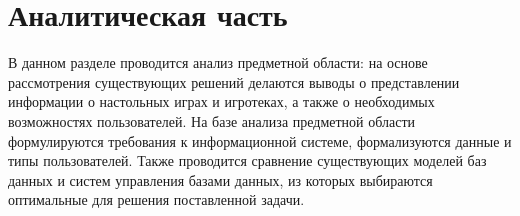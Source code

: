 \chapter{Аналитическая часть}

\begin{comment}
\section{ЧерновЯчок}

На рисунке \ref{img:worm} представлен Червячок (талисман этого курсача) для
повышения настроения при написании данной работы.

\img{5cm}{worm}{Просто червячок, чтобы не было грустно}{worm}

А дальше тут просто черновые записи, а то они сливаются.

\subsection{Про анализ области}

На специализированных сайтах ...

Каждый магазин представляет свои анонсы.

Как правило, анонс игротеки включает: 

Добавим туда еще и организатора.

Предоставляется возможность регистрации через гугл формы. Необходимость
интеграции --- необходимость введения игрока.

Игротека проводится организатором (магазином) в каком-то месте (кафе, антикафе,
ресторане и тп). На ней представлена одна или несколько игр, в которые можно
поиграть. Часто организаторы предоставляют возможность покупки тех же игр прямо
на месте или возможность сделать заказ.

\textbf{\texttt{Анализ}} страниц сайтах об игротеках показал, что
\textbf{\texttt{обычно}} информация об игротеке включает дату, время начала,
продолжительность или время окончания, адрес проведения и стоимость участия.
Также представляется набор игр, по которым проводится игротека.

Информация об играх 
\end{comment}

В данном разделе проводится анализ предметной области: на основе рассмотрения
существующих решений делаются выводы о представлении информации о настольных
играх и игротеках, а также о необходимых возможностях пользователей. На базе
анализа предметной области формулируются требования к информационной системе,
формализуются данные и типы пользователей. Также проводится сравнение
существующих моделей баз данных и систем управления базами данных, из которых
выбираются оптимальные для решения поставленной задачи.

